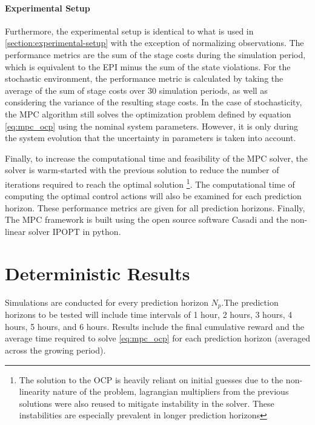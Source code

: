\paragraph{Experimental Setup} Furthermore, the experimental setup is identical to what is used in \autoref{section:experimental-setup} with the exception of normalizing observations. The performance metrics are the sum of the stage costs during the simulation period, which is equivalent to the EPI minus the sum of the state violations. For the stochastic environment, the performance metric is calculated by taking the average of the sum of stage costs over 30 simulation periods, as well as considering the variance of the resulting stage costs. In the case of stochasticity, the MPC algorithm still solves the optimization problem defined by equation \autoref{eq:mpc_ocp} using the nominal system parameters. However, it is only during the system evolution that the uncertainty in parameters is taken into account. 

Finally, to increase the computational time and feasibility of the MPC solver, the solver is warm-started with the previous solution to reduce the number of iterations required to reach the optimal solution  \footnote{The solution to the OCP is heavily reliant on initial guesses due to the non-linearity nature of the problem, lagrangian multipliers from the previous solutions were also reused to mitigate instability in the solver. These instabilities are especially prevalent in longer prediction horizons}. The computational time of computing the optimal control actions will also be examined for each prediction horizon. These performance metrics are given for all prediction horizons. Finally, The MPC framework is built using the open source software Casadi \cite{Andersson2018} and the non-linear solver IPOPT \cite{wachterImplementationInteriorpointFilter2006} in python. 

\section{Deterministic Results}
Simulations are conducted for every prediction horizon $N_p$.The prediction horizons to be tested will include time intervals of 1 hour, 2 hours, 3 hours, 4 hours, 5 hours, and 6 hours. Results include the final cumulative reward and the average time required to solve \autoref{eq:mpc_ocp} for each prediction horizon (averaged across the growing period).

